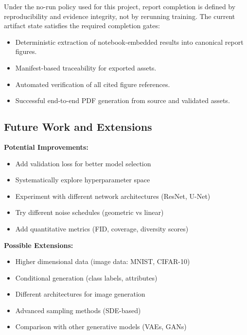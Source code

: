 \documentclass[journal]{IEEEtran}
\begin{document}
Under the no-run policy used for this project, report completion is defined by reproducibility and evidence integrity, not by rerunning training. The current artifact state satisfies the required completion gates:
\begin{itemize}
    \item Deterministic extraction of notebook-embedded results into canonical report figures.
    \item Manifest-based traceability for exported assets.
    \item Automated verification of all cited figure references.
    \item Successful end-to-end PDF generation from source and validated assets.
\end{itemize}

\subsection{Future Work and Extensions}

\textbf{Potential Improvements:}
\begin{itemize}
    \item Add validation loss for better model selection
    \item Systematically explore hyperparameter space
    \item Experiment with different network architectures (ResNet, U-Net)
    \item Try different noise schedules (geometric vs linear)
    \item Add quantitative metrics (FID, coverage, diversity scores)
\end{itemize}

\textbf{Possible Extensions:}
\begin{itemize}
    \item Higher dimensional data (image data: MNIST, CIFAR-10)
    \item Conditional generation (class labels, attributes)
    \item Different architectures for image generation
    \item Advanced sampling methods (SDE-based)
    \item Comparison with other generative models (VAEs, GANs)
\end{itemize}
\end{document}
